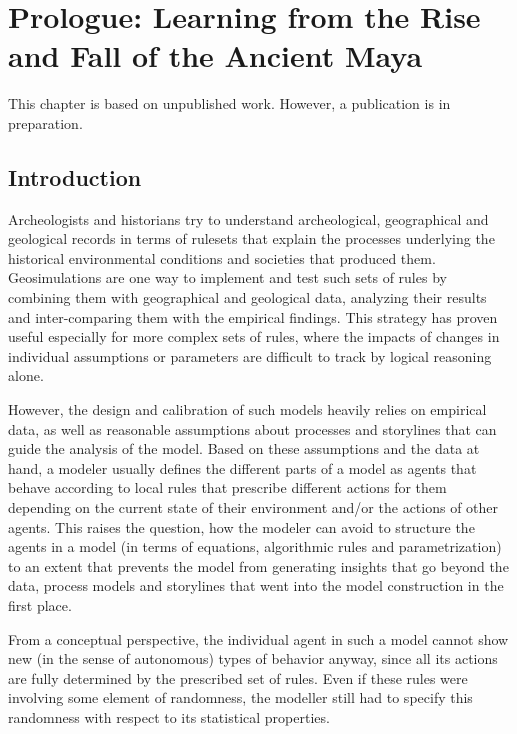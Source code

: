 \chapter{Prologue: Learning from the Rise and Fall of the Ancient Maya}
\label{chapter:maya}
This chapter is based on unpublished work. However, a publication \citep[P1]{Kolb2019a} is in preparation.
\section{Introduction}

Archeologists and historians try to understand archeological, geographical and geological records in terms of rulesets that explain the processes underlying the historical environmental conditions and societies that produced them.
Geosimulations are one way to implement and test such sets of rules by combining them with geographical and geological data, analyzing their results and inter-comparing them with the empirical findings. This strategy has proven useful especially for more complex sets of rules, where the impacts of changes in individual assumptions or parameters are difficult to track by logical reasoning alone. \citep{Zhu2015, Tianduowa2018}

However, the design and calibration of such models heavily relies on empirical data, as well as reasonable assumptions about processes and storylines that can guide the analysis of the model. Based on these assumptions and the data at hand, a modeler usually defines the different parts of a model as agents that behave according to local rules that prescribe different actions for them depending on the current state of their environment and/or the actions of other agents. This raises the question, how the modeler can avoid to structure the agents in a model (in terms of equations, algorithmic rules and parametrization) to an extent that prevents the model from generating insights that go beyond the data, process models and storylines that went into the model construction in the first place.

From a conceptual perspective, the individual agent in such a model cannot show new (in the sense of autonomous) types of behavior anyway, since all its actions are fully determined by the prescribed set of rules. Even if these rules were involving some element of randomness, the modeller still had to specify this randomness with respect to its statistical properties. 

